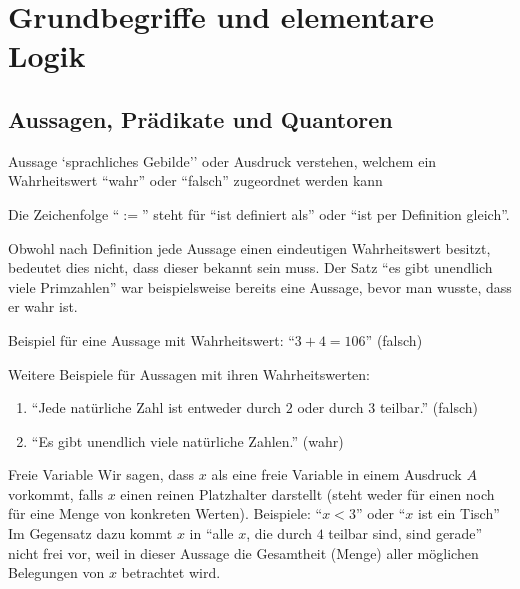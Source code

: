 \section{Grundbegriffe und elementare Logik}

\subsection{Aussagen, Prädikate und Quantoren}

\begin{definition}{Aussage}
    `sprachliches Gebilde'' oder Ausdruck verstehen, welchem ein Wahrheitswert ``wahr'' oder ``falsch'' zugeordnet werden kann
\end{definition}

\begin{remark}
    Die Zeichenfolge ``$:=$'' steht für ``ist definiert als'' oder ``ist per Definition gleich''.
\end{remark}

\begin{remark}
    Obwohl nach Definition jede Aussage einen eindeutigen Wahrheitswert besitzt, bedeutet dies nicht, dass dieser bekannt sein muss. Der Satz ``es gibt unendlich viele Primzahlen'' war beispielsweise bereits eine Aussage, bevor man wusste, dass er wahr ist.
\end{remark}

\begin{example}
    Beispiel für eine Aussage mit Wahrheitswert: ``$3+4=106$'' (falsch)
\end{example}

\begin{example}
    Weitere Beispiele für Aussagen mit ihren Wahrheitswerten:
    \begin{enumerate}
        \item ``Jede natürliche Zahl ist entweder durch $2$ oder durch $3$ teilbar.'' (falsch)
        \item ``Es gibt unendlich viele natürliche Zahlen.'' (wahr)
    \end{enumerate}
\end{example}

\begin{definition}{Freie Variable}
    Wir sagen, dass $x$ als eine freie Variable in einem Ausdruck $A$ vorkommt, falls $x$ einen reinen Platzhalter darstellt (steht weder für einen noch für eine Menge von konkreten Werten). Beispiele: ``$x<3$'' oder ``$x$ ist ein Tisch''
    \\ Im Gegensatz dazu kommt $x$ in ``alle $x$, die durch $4$ teilbar sind, sind gerade'' nicht frei vor, weil in dieser Aussage die Gesamtheit (Menge) aller möglichen Belegungen von $x$ betrachtet wird.
\end{definition}

